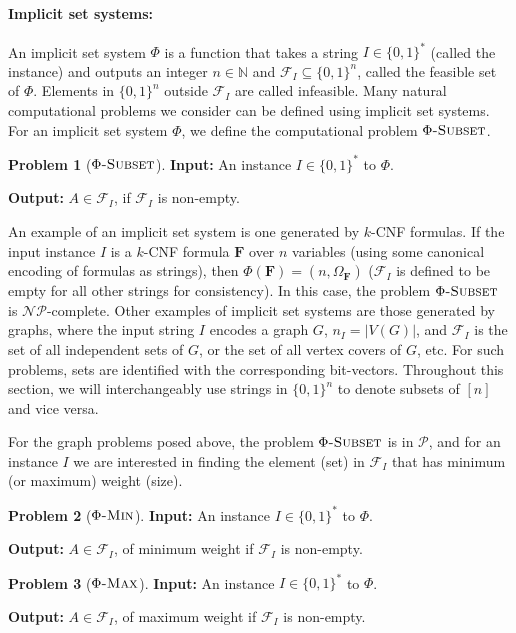 \documentclass[11pt, letterpaper]{article}
\theoremstyle{definition}
\newtheorem{problem}{Problem}
\newcommand{\Q}[1]{\{0,1\}^{#1}}
\newcommand{\f}{\mathbf{F}}
\newcommand{\Om}{\Omega_{\f}}
\newcommand{\calf}{\mathcal{F}}
\newcommand{\p}{\mathcal{P}}
\newcommand{\np}{\mathcal{NP}}
\newcommand{\IN}{\ensuremath{\mathbb{N}}}
\begin{document}
\paragraph{Implicit set systems: }An implicit set system $\Phi$ is a function that takes a string $I \in \{0,1\}^*$ (called the instance) and outputs an integer $n \in \IN$ and $\mathcal{F}_I \subseteq \Q{n}$, called the feasible set of $\Phi$. Elements in $\{0,1\}^n$ outside $\calf_I$ are called infeasible. Many natural computational problems we consider can be defined using implicit set systems. For an implicit set system $\Phi$, we define the computational problem $\Phi\textsc{-Subset}$.
\begin{problem}[$\Phi\textsc{-Subset}$]
    \textbf{Input:} An instance $I \in \{0,1\}^*$ to $\Phi$. 
    
    \textbf{Output:} $A \in \mathcal{F}_I$, if $\mathcal{F}_I$ is non-empty.
\end{problem}
An example of an implicit set system is one generated by $k$-CNF formulas. If the input instance $I$ is a $k$-CNF formula $\f$ over $n$ variables (using some canonical encoding of formulas as strings), then $\Phi(\f)=\left(n, \Om \right)$ ($\mathcal{F}_I$ is defined to be empty for all other strings for consistency). In this case, the problem $\Phi\textsc{-Subset}$ is $\np$-complete. Other examples of implicit set systems are those generated by graphs, where the input string $I$ encodes a graph $G$, $n_I=|V(G)|$, and $\mathcal{F}_I$ is the set of all independent sets of $G$, or the set of all vertex covers of $G$, etc. For such problems, sets are identified with the corresponding bit-vectors. Throughout this section, we will interchangeably use strings in $\Q{n}$ to denote subsets of $[n]$ and vice versa.

For the graph problems posed above, the problem $\Phi\textsc{-Subset}$ is in $\p$, and for an instance $I$ we are interested in finding the element (set) in $\mathcal{F}_I$ that has minimum (or maximum) weight (size). 

\begin{problem}[$\Phi\textsc{-Min}$] \textbf{Input:} An instance $I \in \{0,1\}^*$ to $\Phi$. 

    \textbf{Output:} $A \in \mathcal{F}_I$, of minimum weight if $\mathcal{F}_I$ is non-empty.
\end{problem}
\begin{problem}[$\Phi\textsc{-Max}$]
    \textbf{Input:} An instance $I \in \{0,1\}^*$ to $\Phi$. 
    
    \textbf{Output:} $A \in \mathcal{F}_I$, of maximum weight if $\mathcal{F}_I$ is non-empty.
\end{problem}
\end{document}
